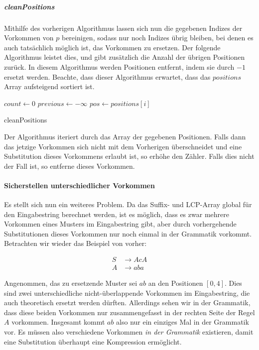 \subparagraph{cleanPositions}

Mithilfe des vorherigen Algorithmus lassen sich nun die gegebenen Indizes der Vorkommen von $p$ bereinigen, sodass nur noch Indizes übrig bleiben, bei denen es auch tatsächlich möglich ist, das Vorkommen zu ersetzen. Der folgende Algorithmus leistet dies, und gibt zusätzlich die Anzahl der übrigen Positionen zurück. In diesem Algorithmus werden Positionen entfernt, indem sie durch $-1$ ersetzt werden. Beachte, dass dieser Algorithmus erwartet, dass das $positions$ Array aufsteigend sortiert ist.

\begin{algorithm}
    $count \leftarrow 0$\;
    $previous \leftarrow -\infty$\;
     {
        $pos \leftarrow positions[i]$\;
    }
    \caption{cleanPositions}
\end{algorithm}

Der Algorithmus iteriert durch das Array der gegebenen Positionen. Falls dann das jetzige Vorkommen sich nicht mit dem Vorherigen überschneidet und eine Substitution dieses Vorkommens erlaubt ist, so erhöhe den Zähler. Falls dies nicht der Fall ist, so entferne dieses Vorkommen.

\paragraph{Sicherstellen unterschiedlicher Vorkommen}

Es stellt sich nun ein weiteres Problem. Da das Suffix- und LCP-Array global für den Eingabestring berechnet werden, ist es möglich, dass es zwar mehrere Vorkommen eines Musters im Eingabestring gibt, aber durch vorhergehende Substitutionen dieses Vorkommen nur noch einmal in der Grammatik vorkommt. Betrachten wir wieder das Beispiel von vorher:

\begin{align*}
    S &\rightarrow AcA\\
    A &\rightarrow aba
\end{align*}

Angenommen, das zu ersetzende Muster sei $ab$ an den Positionen $[0, 4]$. Dies sind zwei unterschiedliche nicht-überlappende Vorkommen im Eingabestring, die auch theoretisch ersetzt werden dürften. Allerdings sehen wir in der Grammatik, dass diese beiden Vorkommen nur zusammengefasst in der rechten Seite der Regel $A$ vorkommen. Insgesamt kommt $ab$ also nur ein einziges Mal in der Grammatik vor. Es müssen also verschiedene Vorkommen \emph{in der Grammatik} existieren, damit eine Substitution überhaupt eine Kompression ermöglicht.

